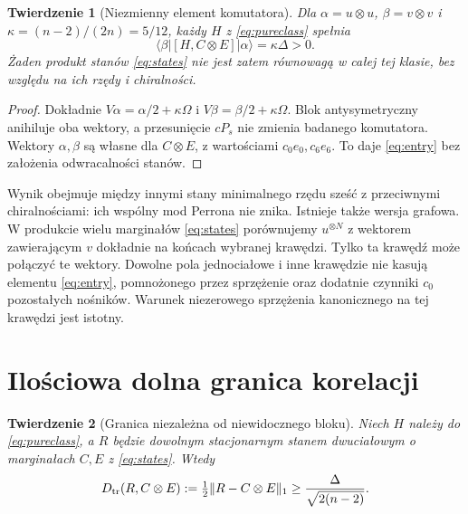\documentclass[11pt,a4paper]{article}
\newtheorem{theorem}{Twierdzenie}
\newcommand{\Dtr}{D_{\rm tr}}
\begin{document}
\begin{theorem}[Niezmienny element komutatora]\label{thm:entry}
Dla $\alpha=u\otimes u$, $\beta=v\otimes v$ i
$\kappa=(n-2)/(2n)=5/12$, każdy $H$ z \eqref{eq:pureclass} spełnia
\begin{equation}\label{eq:entry}
 \langle\beta|[H,C\otimes E]|\alpha\rangle=\kappa\Delta>0.
\end{equation}
Żaden produkt stanów \eqref{eq:states} nie jest zatem równowagą
w całej tej klasie, bez względu na ich rzędy i chiralności.
\end{theorem}

\begin{proof}
Dokładnie $V\alpha=\alpha/2+\kappa\Omega$ i
$V\beta=\beta/2+\kappa\Omega$.
Blok antysymetryczny anihiluje oba wektory, a przesunięcie $cP_s$
nie zmienia badanego komutatora. Wektory $\alpha,\beta$ są własne
dla $C\otimes E$, z wartościami $c_0e_0,c_6e_6$.
To daje \eqref{eq:entry} bez założenia odwracalności stanów.
\end{proof}

Wynik obejmuje między innymi stany minimalnego rzędu sześć z przeciwnymi
chiralnościami: ich wspólny mod Perrona nie znika.
Istnieje także wersja grafowa. W produkcie wielu marginałów
\eqref{eq:states} porównujemy $u^{\otimes N}$ z wektorem zawierającym
$v$ dokładnie na końcach wybranej krawędzi. Tylko ta krawędź może
połączyć te wektory. Dowolne pola jednociałowe i inne krawędzie nie
kasują elementu \eqref{eq:entry}, pomnożonego przez sprzężenie oraz
dodatnie czynniki $c_0$ pozostałych nośników. Warunek niezerowego
sprzężenia kanonicznego na tej krawędzi jest istotny.

\section{Ilościowa dolna granica korelacji}

\begin{theorem}[Granica niezależna od niewidocznego bloku]\label{thm:floor}
Niech $H$ należy do \eqref{eq:pureclass}, a $R$ będzie dowolnym
stacjonarnym stanem dwuciałowym o marginałach $C,E$ z \eqref{eq:states}.
Wtedy
\begin{equation}\label{eq:floor}
 \Dtr(R,C\otimes E):=\tfrac12\|R-C\otimes E\|_1
 \ge\frac{\Delta}{\sqrt{2(n-2)}}.
\end{equation}
\end{theorem}
\end{document}
